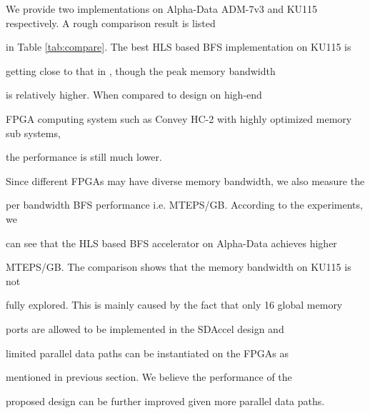 We provide two implementations on Alpha-Data ADM-7v3 and KU115 respectively. A rough comparison result is listed 

in Table \ref{tab:compare}. The best HLS based BFS implementation on KU115 is 

getting close to that in \cite{zhang2017boosting}, though the peak memory bandwidth 

is relatively higher. When compared to design on high-end 

FPGA computing system such as Convey HC-2 with highly optimized memory sub systems, 

the performance is still much lower. 



Since different FPGAs may have diverse memory bandwidth, we also measure the 

per bandwidth BFS performance i.e. MTEPS/GB. According to the experiments, we 

can see that the HLS based BFS accelerator on Alpha-Data achieves higher 

MTEPS/GB. The comparison shows that the memory bandwidth on KU115 is not 

fully explored. This is mainly caused by the fact that only 16 global memory 

ports are allowed to be implemented in the SDAccel design and 

limited parallel data paths can be instantiated on the FPGAs as 

mentioned in previous section. We believe the performance of the 

proposed design can be further improved given more parallel data paths.



